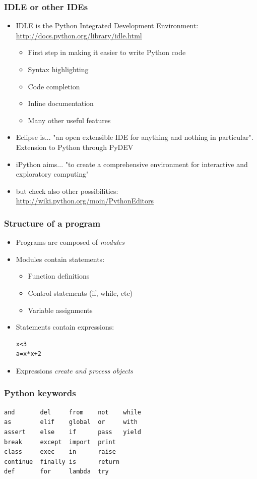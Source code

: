 \documentclass{beamer}
\begin{document}
\begin{frame}
\frametitle{IDLE or other IDEs}
\begin{itemize}
\item IDLE is the Python Integrated Development Environment: \url{http://docs.python.org/library/idle.html}
\begin{itemize}
\item First step in making it easier to write Python code
\item Syntax highlighting
\item Code completion
\item Inline documentation
\item Many other useful features
\end{itemize}
\item Eclipse is... "an open extensible IDE for anything and nothing in particular". Extension to Python through PyDEV
\item iPython aims... "to create a comprehensive environment for interactive and exploratory computing"
\item but check also other possibilities: \url{http://wiki.python.org/moin/PythonEditors}
\end{itemize}
\end{frame}

\begin{frame}[containsverbatim]
\frametitle{Structure of a program}
\begin{itemize}
\item Programs are composed of {\em modules}
\item Modules contain statements:
\begin{itemize}
\item Function definitions
\item Control statements (if, while, etc)
\item Variable assignments
\end{itemize}
\item Statements contain expressions:
\begin{lstlisting}
x<3
a=x*x+2
\end{lstlisting}
\item Expressions {\em create and process objects}
\end{itemize}
\end{frame}

\begin{frame}[containsverbatim]
\frametitle{Python keywords}
\label{ref:reserved}
\begin{lstlisting}
and       del     from    not    while 
as        elif    global  or     with 
assert    else    if      pass   yield 
break     except  import  print 
class     exec    in      raise 
continue  finally is      return 
def       for     lambda  try 
\end{lstlisting}
\end{frame}
\end{document}
